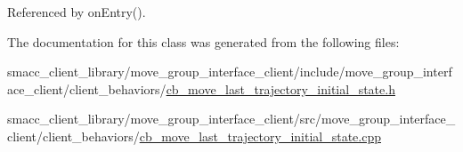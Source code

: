 Referenced by on\+Entry().



The documentation for this class was generated from the following files\+:\begin{DoxyCompactItemize}
\item 
smacc\+\_\+client\+\_\+library/move\+\_\+group\+\_\+interface\+\_\+client/include/move\+\_\+group\+\_\+interface\+\_\+client/client\+\_\+behaviors/\hyperlink{cb__move__last__trajectory__initial__state_8h}{cb\+\_\+move\+\_\+last\+\_\+trajectory\+\_\+initial\+\_\+state.\+h}\item 
smacc\+\_\+client\+\_\+library/move\+\_\+group\+\_\+interface\+\_\+client/src/move\+\_\+group\+\_\+interface\+\_\+client/client\+\_\+behaviors/\hyperlink{cb__move__last__trajectory__initial__state_8cpp}{cb\+\_\+move\+\_\+last\+\_\+trajectory\+\_\+initial\+\_\+state.\+cpp}\end{DoxyCompactItemize}
